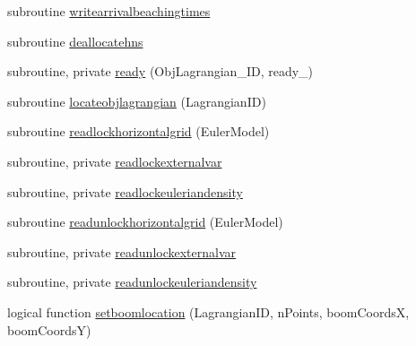 \begin{DoxyCompactItemize}
\item 
subroutine \mbox{\hyperlink{namespacemodulelagrangianglobal_abe2b20a8a7925f8d626cdc676a372c07}{writearrivalbeachingtimes}}
\item 
subroutine \mbox{\hyperlink{namespacemodulelagrangianglobal_a34137a5604bf2312cac012e0415fdb9f}{deallocatehns}}
\item 
subroutine, private \mbox{\hyperlink{namespacemodulelagrangianglobal_ab75b97011a170683ac68816525771168}{ready}} (Obj\+Lagrangian\+\_\+\+ID, ready\+\_\+)
\item 
subroutine \mbox{\hyperlink{namespacemodulelagrangianglobal_adde8d4f2aa77a7a09dbd30d7200dcc6d}{locateobjlagrangian}} (Lagrangian\+ID)
\item 
subroutine \mbox{\hyperlink{namespacemodulelagrangianglobal_adc70a932c70ec9be9f9ebdfe0fe60e08}{readlockhorizontalgrid}} (Euler\+Model)
\item 
subroutine, private \mbox{\hyperlink{namespacemodulelagrangianglobal_a4051f81e28e0e18dc8950a11d2a7ae65}{readlockexternalvar}}
\item 
subroutine, private \mbox{\hyperlink{namespacemodulelagrangianglobal_a050ae9cc2e89b6c4a9988fc3de650380}{readlockeuleriandensity}}
\item 
subroutine \mbox{\hyperlink{namespacemodulelagrangianglobal_a4240be74d2a3261aba8c239da33b8efe}{readunlockhorizontalgrid}} (Euler\+Model)
\item 
subroutine, private \mbox{\hyperlink{namespacemodulelagrangianglobal_ab2139b94b323af2c1671fe3b4340218f}{readunlockexternalvar}}
\item 
subroutine, private \mbox{\hyperlink{namespacemodulelagrangianglobal_a553d94d2684b09095403feab67bef598}{readunlockeuleriandensity}}
\item 
logical function \mbox{\hyperlink{namespacemodulelagrangianglobal_a026e5461ba329b59c22df0570d3c4cd4}{setboomlocation}} (Lagrangian\+ID, n\+Points, boom\+CoordsX, boom\+CoordsY)
\end{DoxyCompactItemize}
